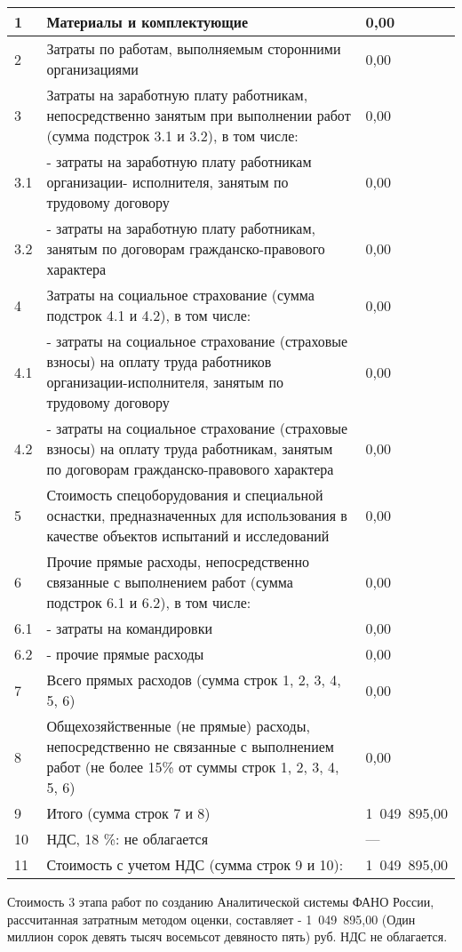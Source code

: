 \begin{center}
\begin{longtable}{|p{40pt}|p{280pt}|p{90pt}|}
1	& Материалы и комплектующие	& 0,00 \\ \hline
2	& Затраты по работам, выполняемым сторонними организациями	& 0,00 \\ \hline
3	& Затраты на заработную плату работникам, непосредственно занятым при выполнении работ (сумма подстрок 3.1 и 3.2), в том числе:	& 0,00 \\ \hline
3.1	& - затраты на заработную плату работникам организации- исполнителя, занятым по трудовому договору	& 0,00 \\ \hline
3.2	& - затраты на заработную плату работникам, занятым по договорам гражданско-правового характера	& 0,00 \\ \hline
4	& Затраты на социальное страхование (сумма подстрок 4.1 и 4.2), в том числе: &	0,00 \\ \hline
4.1	& - затраты на социальное страхование (страховые взносы) на оплату труда работников организации-исполнителя, занятым по трудовому договору	& 0,00 \\ \hline
4.2	& - затраты на социальное страхование (страховые взносы) на оплату труда работникам, занятым по договорам гражданско-правового характера	& 0,00 \\ \hline
5	& Стоимость спецоборудования и специальной оснастки, предназначенных для использования в качестве объектов испытаний и исследований	& 0,00 \\ \hline
6 &	Прочие прямые расходы, непосредственно связанные с выполнением работ (сумма подстрок 6.1 и 6.2), в том числе:	& 0,00 \\ \hline
6.1	& - затраты на командировки	& 0,00 \\ \hline
6.2	& - прочие прямые расходы	& 0,00 \\ \hline
7	& Всего прямых расходов (сумма строк 1, 2, 3, 4, 5, 6) &	0,00 \\ \hline
8	& Общехозяйственные (не прямые) расходы, непосредственно не связанные с выполнением работ (не более 15\% от суммы строк 1, 2, 3, 4, 5, 6)	& 0,00 \\ \hline
9	& Итого (сумма строк 7 и 8)	& 1~049~895,00 \\ \hline
10	& НДС, 18 \%: не облагается & --- \\ \hline
11 & Стоимость с учетом НДС (сумма строк 9 и 10): &	1~049~895,00 \\ \hline

  \end{longtable}
\end{center}

Стоимость 3 этапа работ по созданию Аналитической системы ФАНО России, рассчитанная затратным методом оценки, составляет - 1~049~895,00 (Один миллион сорок девять тысяч восемьсот девяносто пять) руб. НДС не облагается.



